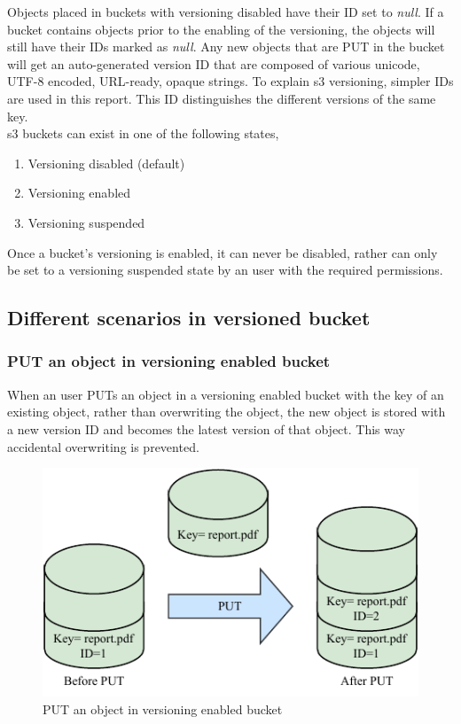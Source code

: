 \documentclass{home_assignment}
\begin{document}
    Objects placed in buckets with versioning disabled have their ID set to \textit{null}. If a bucket contains objects prior to the enabling of the versioning, the objects will still have their IDs marked as \textit{null}. Any new objects that are PUT in the bucket will get an auto-generated version ID that are composed of various unicode, UTF-8 encoded, URL-ready, opaque strings. To explain \acrshort{s3} versioning, simpler IDs are used in this report.
    This ID distinguishes the different versions of the same key. \\
    \acrshort{s3} buckets can exist in one of the following states,
    \begin{enumerate}
        \item Versioning disabled (default)
        \item Versioning enabled
        \item Versioning suspended
    \end{enumerate}
    Once a bucket's versioning is enabled, it can never be disabled, rather can only be set to a versioning suspended state by an user with the required permissions.
    \subsection{Different scenarios in versioned bucket}
    \subsubsection{PUT an object in versioning enabled bucket}
    When an user PUTs an object in a versioning enabled bucket with the key of an existing object, rather than overwriting the object, the new object is stored with a new version ID and becomes the latest version of that object. This way accidental overwriting is prevented.
    \begin{figure}[H]
        \centering
        \includegraphics[scale=1.3]{../Figures/versioning_put}
        \caption{PUT an object in versioning enabled bucket}
        \label{fig:put}
    \end{figure}
  
\end{document}
